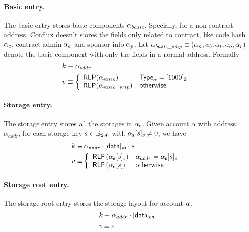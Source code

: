 \paragraph{Basic entry.} The basic entry stores basic components $\mathbf{\alpha}_{basic}$. Specially, for a non-contract address, Conflux doesn't stores the fields only related to contract, like code hash $\mathbf{\alpha}_c$, contract admin $\mathbf{\alpha}_a$ and sponsor info $\mathbf{\alpha}_p$. Let $\mathbf{\alpha}_{basic\_smp}\equiv (\mathbf{\alpha}_n, \mathbf{\alpha}_b, \mathbf{\alpha}_t, \mathbf{\alpha}_o, \mathbf{\alpha}_r)$ denote the basic component with only the fields in a normal address. Formally
\begin{align}
	&k\equiv \alpha_{addr}\\
	&v\equiv \left\{\begin{array}{ll}
		\mathsf{RLP}(\mathbf{\alpha}_{basic}) & \mathsf{Type}_\alpha=[1000]_2 \\
		\mathsf{RLP}(\mathbf{\alpha}_{basic\_smp}) & \mathsf{otherwise}
	\end{array}\right.
\end{align}
	
	

\paragraph{Storage entry.} The storage entry stores all the storages in $\mathbf{\alpha}_{\bf s}$. Given account $\alpha$ with address $\alpha_{addr}$, for each storage key $s\in \mathbb{B}_{256}$ with $\mathbf{\alpha}_{\bf s}[s]_v\neq 0$, we have 
\begin{align}
	&k\equiv \alpha_{addr}\cdot [{\sf data}]_{\sf ch}\cdot s \\
	&v\equiv \left\{ \begin{array}{ll}
		\mathsf{RLP}\left(\mathbf{\alpha}_{\bf s}[s]_v\right) & \alpha_{addr} = \mathbf{\alpha}_{\bf s}[s]_o \\ 
		\mathsf{RLP}\left(\mathbf{\alpha}_{\bf s}[s]\right) & \mbox{otherwise}
	\end{array}\right.
\end{align}

\paragraph{Storage root entry.} The storage root entry stores the storage layout for account $\mathbf{\alpha}$. 
\begin{align}
	&k\equiv \alpha_{addr}\cdot [{\sf data}]_{\sf ch}\\
	&v\equiv \mathbb{\varepsilon}
\end{align}

